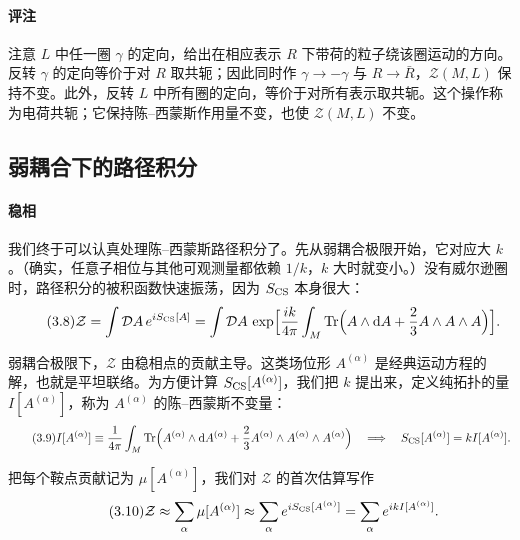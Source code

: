 \paragraph{评注}
注意 $L$ 中任一圈 $\gamma$ 的定向，给出在相应表示 $R$ 下带荷的粒子绕该圈运动的方向。反转 $\gamma$ 的定向等价于对 $R$ 取共轭；因此同时作 $\gamma\to-\gamma$ 与 $R\to\bar R$，$\mathcal{Z}(M,L)$ 保持不变。此外，反转 $L$ 中所有圈的定向，等价于对所有表示取共轭。这个操作称为电荷共轭；它保持陈--西蒙斯作用量不变，也使 $\mathcal{Z}(M,L)$ 不变。

\subsection{弱耦合下的路径积分}\label{sec:3.2}

\paragraph{稳相}
我们终于可以认真处理陈--西蒙斯路径积分了。先从弱耦合极限开始，它对应大 $k$。（确实，任意子相位与其他可观测量都依赖 $1/k$，$k$ 大时就变小。）没有威尔逊圈时，路径积分的被积函数快速振荡，因为 $S_{\mathrm{CS}}$ 本身很大：
\begin{equation}\tag{3.8}\label{eq:3.8}
  \mathcal{Z} = \int\mathcal{D}A\,e^{iS_{\mathrm{CS}}[A]}
  = \int\mathcal{D}A\,\exp\Bigl[\frac{ik}{4\pi}\int_M\operatorname{Tr}\Bigl(A\wedge\mathrm{d} A + \frac{2}{3}A\wedge A\wedge A\Bigr)\Bigr].
\end{equation}

弱耦合极限下，$\mathcal{Z}$ 由稳相点的贡献主导。这类场位形 $A^{(\alpha)}$ 是经典运动方程的解，也就是平坦联络。为方便计算 $S_{\mathrm{CS}}[A^{(\alpha)}]$，我们把 $k$ 提出来，定义纯拓扑的量 $I[A^{(\alpha)}]$，称为 $A^{(\alpha)}$ 的陈--西蒙斯不变量：
\begin{equation}\tag{3.9}\label{eq:3.9}
  I[A^{(\alpha)}] \equiv \frac{1}{4\pi}\int_M\operatorname{Tr}\Bigl(A^{(\alpha)}\wedge\mathrm{d} A^{(\alpha)} + \frac{2}{3}A^{(\alpha)}\wedge A^{(\alpha)}\wedge A^{(\alpha)}\Bigr)
  \quad\Longrightarrow\quad S_{\mathrm{CS}}[A^{(\alpha)}] = kI[A^{(\alpha)}].
\end{equation}

把每个鞍点贡献记为 $\mu[A^{(\alpha)}]$，我们对 $\mathcal{Z}$ 的首次估算写作
\begin{equation}\tag{3.10}\label{eq:3.10}
  \mathcal{Z} \approx \sum_\alpha \mu[A^{(\alpha)}] \approx \sum_\alpha e^{iS_{\mathrm{CS}}[A^{(\alpha)}]} = \sum_\alpha e^{ikI[A^{(\alpha)}]}.
\end{equation}

